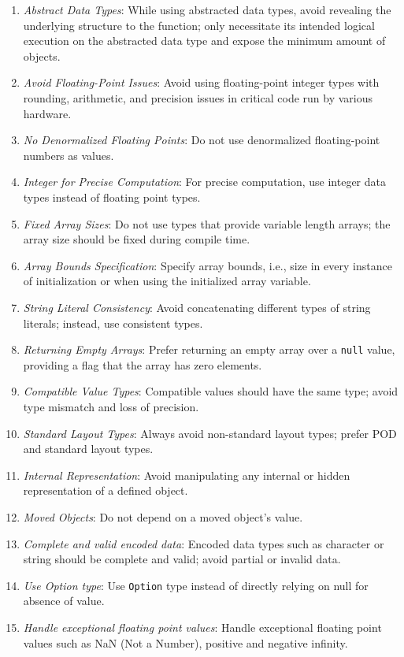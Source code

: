 \documentclass[9pt]{IEEEtran} %
\begin{document}
\begin{enumerate}
  \item \textit{Abstract Data Types}: While using abstracted data types, avoid revealing the underlying structure to the function; only necessitate its intended logical execution on the abstracted data type and expose the minimum amount of objects.
  \item \textit{Avoid Floating-Point Issues}: Avoid using floating-point integer types with rounding, arithmetic, and precision issues in critical code run by various hardware.
  \item \textit{No Denormalized Floating Points}: Do not use denormalized floating-point numbers as values.
  \item \textit{Integer for Precise Computation}: For precise computation, use integer data types instead of floating point types.
  \item \textit{Fixed Array Sizes}: Do not use types that provide variable length arrays; the array size should be fixed during compile time.
  \item \textit{Array Bounds Specification}: Specify array bounds, i.e., size in every instance of initialization or when using the initialized array variable.
  \item \textit{String Literal Consistency}: Avoid concatenating different types of string literals; instead, use consistent types.
  \item \textit{Returning Empty Arrays}: Prefer returning an empty array over a \texttt{null} value, providing a flag that the array has zero elements.
  \item \textit{Compatible Value Types}: Compatible values should have the same type; avoid type mismatch and loss of precision.
  \item \textit{Standard Layout Types}: Always avoid non-standard layout types; prefer POD and standard layout types.
  \item \textit{Internal Representation}: Avoid manipulating any internal or hidden representation of a defined object.
  \item \textit{Moved Objects}: Do not depend on a moved object's value.
  \item \textit{Complete and valid encoded data}: Encoded data types such as character or string should be complete and valid; avoid partial or invalid data.
  \item \textit{Use Option type}: Use \texttt{Option} type instead of directly relying on null for absence of value.
  \item \textit{Handle exceptional floating point values}: Handle exceptional floating point values such as NaN (Not a Number), positive and negative infinity.

\end{enumerate}
\end{document}
